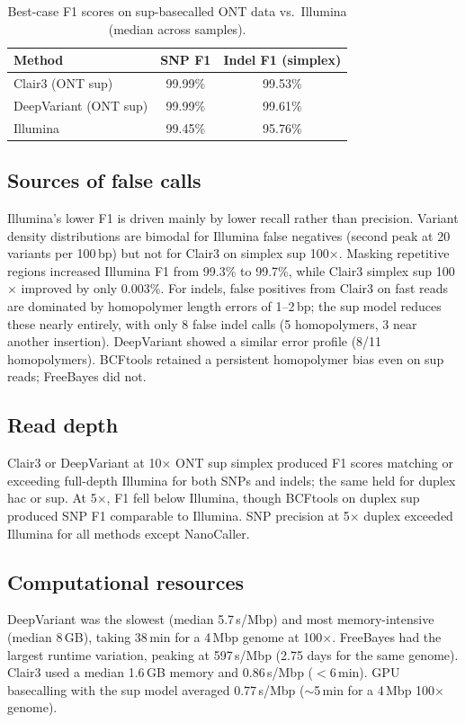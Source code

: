 \documentclass[11pt]{article}
\begin{document}
\begin{table}[h]
\centering
\caption{Best-case F1 scores on sup-basecalled ONT data vs.\ Illumina (median across samples).}
\begin{tabular}{lcc}
\toprule
Method & SNP F1 & Indel F1 (simplex) \\
\midrule
Clair3 (ONT sup)      & 99.99\% & 99.53\% \\
DeepVariant (ONT sup) & 99.99\% & 99.61\% \\
Illumina              & 99.45\% & 95.76\% \\
\bottomrule
\end{tabular}
\end{table}

\subsection{Sources of false calls}
Illumina's lower F1 is driven mainly by lower recall rather than precision. Variant density distributions are bimodal for Illumina false negatives (second peak at 20 variants per 100\,bp) but not for Clair3 on simplex sup 100$\times$. Masking repetitive regions increased Illumina F1 from 99.3\% to 99.7\%, while Clair3 simplex sup 100$\times$ improved by only 0.003\%. For indels, false positives from Clair3 on fast reads are dominated by homopolymer length errors of 1--2\,bp; the sup model reduces these nearly entirely, with only 8 false indel calls (5 homopolymers, 3 near another insertion). DeepVariant showed a similar error profile (8/11 homopolymers). BCFtools retained a persistent homopolymer bias even on sup reads; FreeBayes did not.

\subsection{Read depth}
Clair3 or DeepVariant at 10$\times$ ONT sup simplex produced F1 scores matching or exceeding full-depth Illumina for both SNPs and indels; the same held for duplex hac or sup. At 5$\times$, F1 fell below Illumina, though BCFtools on duplex sup produced SNP F1 comparable to Illumina. SNP precision at 5$\times$ duplex exceeded Illumina for all methods except NanoCaller.

\subsection{Computational resources}
DeepVariant was the slowest (median 5.7\,s/Mbp) and most memory-intensive (median 8\,GB), taking 38\,min for a 4\,Mbp genome at 100$\times$. FreeBayes had the largest runtime variation, peaking at 597\,s/Mbp (2.75 days for the same genome). Clair3 used a median 1.6\,GB memory and 0.86\,s/Mbp ($<$6\,min). GPU basecalling with the sup model averaged 0.77\,s/Mbp ($\sim$5\,min for a 4\,Mbp 100$\times$ genome).
\end{document}
